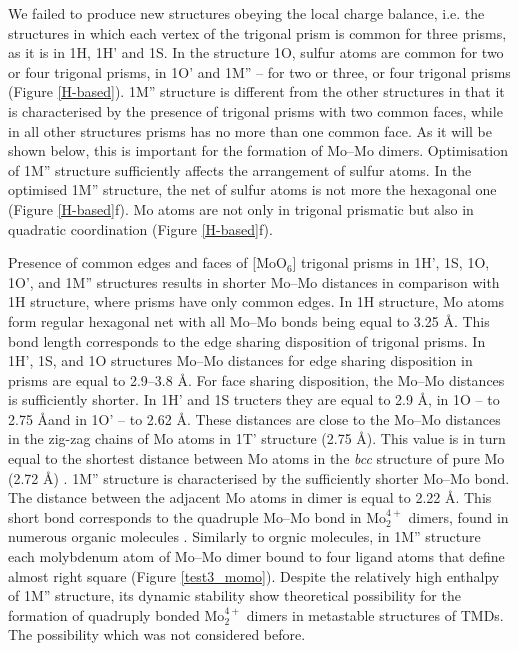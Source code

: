 \documentclass[a4paperm]{article}
\begin{document}
We failed to produce new structures obeying the local charge balance, i.e. the structures in which each vertex of the trigonal prism is common for three prisms, as it is in 1H, 1H' and 1S.
In the structure 1O, sulfur atoms are common for two or four trigonal prisms, in 1O' and 1M'' – for two or three, or four trigonal prisms (Figure \ref{H-based}).
1M'' structure is different from the other structures in that it is characterised by the presence of trigonal prisms with two common faces, while in all other structures prisms has no more than one common face.
As it will be shown below, this is important for the formation of Mo--Mo dimers.
Optimisation of 1M'' structure sufficiently affects the arrangement of sulfur atoms.
In the optimised 1M'' structure, the net of sulfur atoms is not more the hexagonal one (Figure \ref{H-based}f).
Mo atoms are not only in trigonal prismatic but also in quadratic coordination (Figure \ref{H-based}f).


Presence of common edges and faces of [MoO$_6$] trigonal prisms in 1H', 1S, 1O, 1O', and 1M'' structures results in shorter Mo--Mo distances in comparison with 1H structure, where prisms have only common edges.
In 1H structure, Mo atoms form regular hexagonal net with all Mo--Mo bonds being equal to 3.25 \AA.
This bond length corresponds to the edge sharing disposition of trigonal prisms.
In 1H', 1S, and 1O structures Mo--Mo distances for edge sharing disposition in prisms are equal to 2.9--3.8 \AA.
For face sharing disposition, the Mo--Mo distances is sufficiently shorter.
In 1H' and 1S tructers they are equal to 2.9 \AA, in 1O -- to 2.75 \AA and in 1O' -- to 2.62 \AA.
These distances are close to the Mo--Mo distances in the zig-zag chains of Mo atoms in 1T' structure (2.75 \AA).
This value is in turn equal to the shortest distance between Mo atoms in the {\it bcc} structure of pure Mo (2.72 \AA) \cite{MoV}.
1M'' structure is characterised by the sufficiently shorter Mo--Mo bond.
The distance between the adjacent Mo atoms in dimer is equal to 2.22 \AA.
This short bond corresponds to the quadruple Mo--Mo bond in Mo$_2^{4+}$ dimers, found in numerous organic molecules \cite{momo}.
Similarly to orgnic molecules, in 1M'' structure  each molybdenum atom of Mo--Mo dimer bound to four ligand atoms that define almost right square (Figure \ref{test3_momo}).
Despite the relatively high enthalpy of 1M'' structure, its dynamic stability show theoretical possibility for the formation of quadruply bonded Mo$_2^{4+}$ dimers in metastable structures of TMDs.
The possibility which was not considered before.
\end{document}
